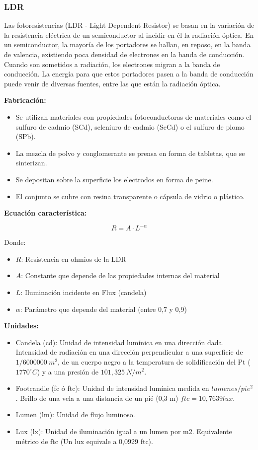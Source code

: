 \subsubsection{LDR}

Las fotoresistencias (LDR - Light Dependent Resistor) se basan en la variación de la resistencia eléctrica de un semiconductor al incidir en él la radiación óptica. En un semiconductor, la mayoría de los portadores se hallan, en reposo, en la banda de valencia, existiendo poca densidad de electrones en la banda de conducción. Cuando son sometidos a radiación, los electrones migran a la banda de conducción. La energía para que estos portadores pasen a la banda de conducción puede venir de diversas fuentes, entre las que están la radiación óptica.

\textbf{Fabricación:}
\begin{itemize}
    \item Se utilizan materiales con propiedades fotoconductoras de materiales como el sulfuro de cadmio (SCd), seleniuro de cadmio (SeCd) o el sulfuro de plomo (SPb).
    \item La mezcla de polvo y conglomerante se prensa en forma de tabletas, que se sinterizan.
    \item Se depositan sobre la superficie los electrodos en forma de peine.
    \item El conjunto se cubre con resina transparente o cápsula de vidrio o plástico.
\end{itemize}

\textbf{Ecuación característica:}

\begin{equation}
    R = A \cdot L ^{-\alpha}
\end{equation}

Donde:
\begin{itemize}
    \item $R$: Resistencia en ohmios de la LDR
    \item $A$: Constante que depende de las propiedades internas del material
    \item $L$: Iluminación incidente en Flux (candela)
    \item $\alpha$: Parámetro que depende del material (entre 0,7 y 0,9)
\end{itemize}

\textbf{Unidades:}
\begin{itemize}
    \item Candela (cd): Unidad de intensidad lumínica en una dirección dada. Intensidad de radiación en una dirección perpendicular a una superficie de $1/6000000\ m^2$, de un cuerpo negro a la temperatura de solidificación del Pt ($1770 ^\circ C$) y a una presión de $101,325\ N/m^2$.
    \item Footcandle (fc ó ftc): Unidad de intensidad lumínica medida en $lumenes/pie^2$. Brillo de una vela a una distancia de un pié (0,3 m) $ftc = 10,7639 lux$.
    \item Lumen (lm): Unidad de flujo luminoso.
    \item Lux (lx): Unidad de iluminación igual a un lumen por m2. Equivalente métrico de ftc (Un lux equivale a 0,0929 ftc).
\end{itemize}

